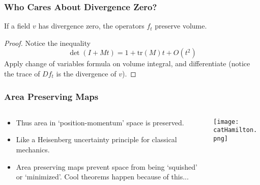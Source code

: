 \documentclass{beamer}
\begin{document}
\begin{frame}
\frametitle{Who Cares About Divergence Zero?}
\begin{theorem}
    If a field $v$ has divergence zero, the operators $f_t$ preserve volume.
\end{theorem}
\begin{proof}
    Notice the inequality
    \[ \det(I + M t) = 1 + \text{tr}(M) t + O(t^2) \]
    Apply change of variables formula on volume integral, and differentiate (notice the trace of $Df_t$ is the divergence of $v$).
\end{proof}
\end{frame}

\begin{frame}
\frametitle{Area Preserving Maps}
\begin{columns}
\begin{column}{.6\textwidth}
\begin{itemize}
    \item<1-> Thus area in `position-momentum' space is preserved.
    \item<2-> Like a Heisenberg uncertainty principle for classical mechanics.
    \item<3-> Area preserving maps prevent space from being `squished' or `minimized'. Cool theorems happen because of this...
\end{itemize}
\end{column}
\begin{column}{.4\textwidth}
\texttt{[image: catHamilton.png]}
\end{column}
\end{columns}
\end{frame}
\end{document}
